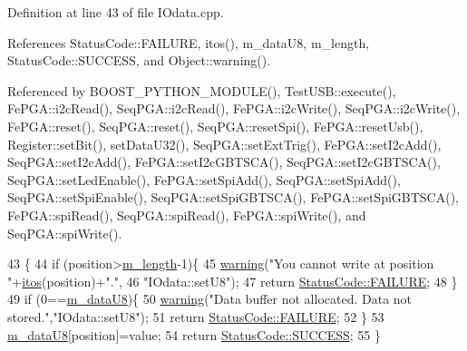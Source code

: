 Definition at line 43 of file I\+Odata.\+cpp.



References Status\+Code\+::\+F\+A\+I\+L\+U\+RE, itos(), m\+\_\+data\+U8, m\+\_\+length, Status\+Code\+::\+S\+U\+C\+C\+E\+SS, and Object\+::warning().



Referenced by B\+O\+O\+S\+T\+\_\+\+P\+Y\+T\+H\+O\+N\+\_\+\+M\+O\+D\+U\+L\+E(), Test\+U\+S\+B\+::execute(), Fe\+P\+G\+A\+::i2c\+Read(), Seq\+P\+G\+A\+::i2c\+Read(), Fe\+P\+G\+A\+::i2c\+Write(), Seq\+P\+G\+A\+::i2c\+Write(), Fe\+P\+G\+A\+::reset(), Seq\+P\+G\+A\+::reset(), Seq\+P\+G\+A\+::reset\+Spi(), Fe\+P\+G\+A\+::reset\+Usb(), Register\+::set\+Bit(), set\+Data\+U32(), Seq\+P\+G\+A\+::set\+Ext\+Trig(), Fe\+P\+G\+A\+::set\+I2c\+Add(), Seq\+P\+G\+A\+::set\+I2c\+Add(), Fe\+P\+G\+A\+::set\+I2c\+G\+B\+T\+S\+C\+A(), Seq\+P\+G\+A\+::set\+I2c\+G\+B\+T\+S\+C\+A(), Seq\+P\+G\+A\+::set\+Led\+Enable(), Fe\+P\+G\+A\+::set\+Spi\+Add(), Seq\+P\+G\+A\+::set\+Spi\+Add(), Seq\+P\+G\+A\+::set\+Spi\+Enable(), Seq\+P\+G\+A\+::set\+Spi\+G\+B\+T\+S\+C\+A(), Fe\+P\+G\+A\+::set\+Spi\+G\+B\+T\+S\+C\+A(), Fe\+P\+G\+A\+::spi\+Read(), Seq\+P\+G\+A\+::spi\+Read(), Fe\+P\+G\+A\+::spi\+Write(), and Seq\+P\+G\+A\+::spi\+Write().


\begin{DoxyCode}
43                                                             \{
44   \textcolor{keywordflow}{if} (position>\hyperlink{classIOdata_afabe57441da019eb614d277799106aac}{m\_length}-1)\{
45     \hyperlink{classObject_a65cd4fda577711660821fd2cd5a3b4c9}{warning}(\textcolor{stringliteral}{"You cannot write at position "}+\hyperlink{Tools_8h_af330027dbdafb9a30768b3613c553e60}{itos}(position)+\textcolor{stringliteral}{"."},
46         \textcolor{stringliteral}{"IOdata::setU8"});
47     \textcolor{keywordflow}{return} \hyperlink{classStatusCode_a6f565cbeadc76d14c72f047e5e85eb4ba3da73d4c469762eb9d3c960368252b26}{StatusCode::FAILURE};
48   \}
49   \textcolor{keywordflow}{if} (0==\hyperlink{classIOdata_a9c4c0dc5104f7f3b170e30ab78fe61e7}{m\_dataU8})\{
50     \hyperlink{classObject_a65cd4fda577711660821fd2cd5a3b4c9}{warning}(\textcolor{stringliteral}{"Data buffer not allocated. Data not stored."},\textcolor{stringliteral}{"IOdata::setU8"});
51     \textcolor{keywordflow}{return} \hyperlink{classStatusCode_a6f565cbeadc76d14c72f047e5e85eb4ba3da73d4c469762eb9d3c960368252b26}{StatusCode::FAILURE};
52   \}
53   \hyperlink{classIOdata_a9c4c0dc5104f7f3b170e30ab78fe61e7}{m\_dataU8}[position]=value;
54   \textcolor{keywordflow}{return} \hyperlink{classStatusCode_a6f565cbeadc76d14c72f047e5e85eb4badd0da38d3ba0d922efd1f4619bc37ad8}{StatusCode::SUCCESS};
55 \}
\end{DoxyCode}
\mbox{\label{classIOdata_a20f30a9f4673713616447b1b5e9817d5}} 
